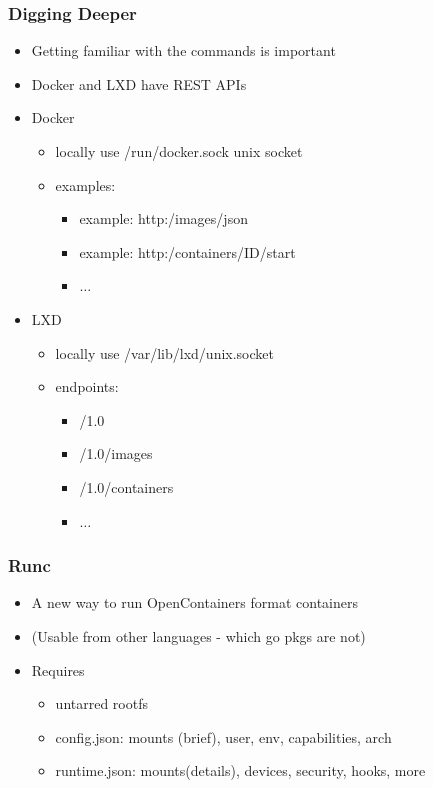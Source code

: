 \documentclass{beamer}
\begin{document}
\begin{frame}
\frametitle{Digging Deeper}
\begin{itemize}
  \item Getting familiar with the commands is important
  \item Docker and LXD have REST APIs
  \item Docker

    \begin{itemize}
      \item locally use /run/docker.sock unix socket
      \item examples:
        \begin{itemize}
          \item example: http:/images/json
          \item example: http:/containers/ID/start
          \item $\ldots$
        \end{itemize}
    \end{itemize}

  \item LXD

    \begin{itemize}
      \item locally use /var/lib/lxd/unix.socket
      \item endpoints:
        \begin{itemize}
          \item /1.0
          \item /1.0/images
          \item /1.0/containers
          \item $\ldots$
        \end{itemize}
    \end{itemize}

\end{itemize}
\end{frame}

\begin{frame}
\frametitle{Runc}
\begin{itemize}
\item A new way to run OpenContainers format containers
\item (Usable from other languages - which go pkgs are not)
\item Requires
  \begin{itemize}
  \item untarred rootfs
  \item config.json: mounts (brief), user, env, capabilities, arch
  \item runtime.json: mounts(details), devices, security, hooks, more
  \end{itemize}
\end{itemize}
\end{frame}
\end{document}
